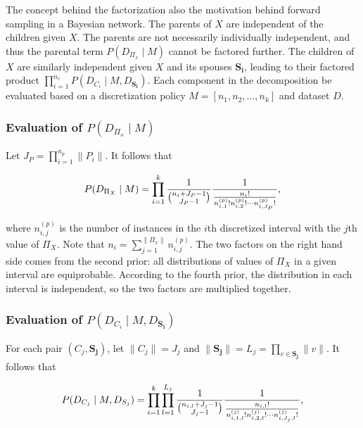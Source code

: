The concept behind the factorization also the motivation behind forward sampling in a Bayesian network.
The parents of $X$ are independent of the children given $X$.
The parents are not necessarily individually independent, and thus the parental term $P(D_{\Pi_x} \mid M)$ cannot be factored further.
The children of $X$ are similarly independent given $X$ and its spouses $\boldsymbol{S_i}$, leading to their factored product $\prod_{i = 1}^{n_c} P(D_{C_i} \mid M, D_{\boldsymbol{S_i}})$.
Each component in the decomposition be evaluated based on a discretization policy $M = [n_1,n_2,\ldots,n_k]$ and dataset $D$.

\subsubsection{Evaluation of $P(D_{\Pi_x} \mid M)$}
Let $J_P = \prod_{i=1}^{n_p} \| P_i \|$. It follows that

\begin{equation}
\label{eq:likelihood_one}
P(D_{\Pi_X} \mid M) = \prod_{i=1}^k  {{1}\over{{n_i + J_P - 1}\choose{J_P -1}}}
{{1}\over{ {{{n}_i}!}\over{ {n^{(p)}_{i,1} !} {n^{(p)}_{i,2} !} \cdots {n^{(p)}_{i,J_P} !}}  }}\text{,}
\end{equation}

\noindent
where $n^{(p)}_{i,j}$ is the number of instances in the $i$th discretized interval with the $j$th value of $\Pi_X$.
Note that $n_i = \sum_{j=1}^{\| \Pi_x \|} n^{(p)}_{i,j}$.
The two factors on the right hand side comes from the second prior: all distributions of values of $\Pi_X$ in a given interval are equiprobable. According to the fourth prior, the distribution in each interval is independent, so the two factors are multiplied together.

\subsubsection{Evaluation of $P(D_{C_i} \mid M, D_{\boldsymbol{S_i}})$}
For each pair $(C_j, \boldsymbol{S_j})$, let $\|C_j \| = J_j$ and $\| \boldsymbol{S_j} \| = L_j = \prod_{v \in \boldsymbol{S_j}} \| v \|$. It follows that

\begin{equation}
\label{eq:likelihood_two}
P(D_{C_j}  \mid M, D_{S_j}) =
\prod_{i=1}^{k} \prod_{l=1}^{L_j} {{1}\over{{n_{i,l} + J_j - 1}\choose{J_j-1}}}
{{1}\over{ {{n_{i,l}}!}\over{ {n^{(j)}_{i,1,l} !} {n^{(j)}_{i,2,l} !} \cdots {n^{(j)}_{i,J_j,l} !}}  }}\text{,}
\end{equation}

